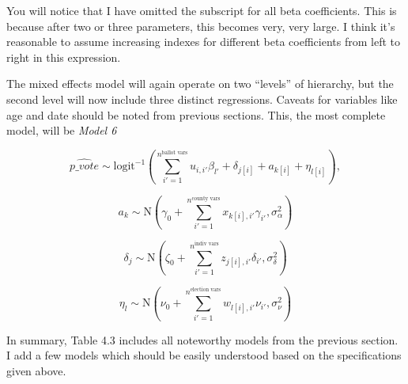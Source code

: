 \documentclass[12pt,twoside]{reedthesis}
\begin{document}
  You will notice that I have omitted the subscript for all beta
  coefficients. This is because after two or three parameters, this
  becomes very, very large. I think it's reasonable to assume increasing
  indexes for different beta coefficients from left to right in this
  expression.
  
  The mixed effects model will again operate on two ``levels'' of
  hierarchy, but the second level will now include three distinct
  regressions. Caveats for variables like age and date should be noted
  from previous sections. This, the most complete model, will be
  \emph{Model 6}
  
  \[\hat{p\_vote} \sim \text{logit}^{-1}(\sum_{i' = 1}^{n^{\text{ballot vars}}}u_{i,i'}\beta_{l'} +\delta_{j[i]} + a_{k[i]} + \eta_{l[i]}),\]
  
  \[a_{k} \sim \text{N}(\gamma_0 + \sum_{i'=1}^{n^{\text{county vars}}}x_{k[i], i'}\gamma_{i'}, \sigma_{\alpha}^2)\]
  
  \[\delta_{j} \sim \text{N}(\zeta_0 + \sum_{i'=1}^{n^{\text{indiv vars}}}z_{j[i], i'}\delta_{i'}, \sigma_{\delta}^2)\]
  
  \[\eta_{l} \sim \text{N}(\nu_0 + \sum_{i'=1}^{n^{\text{election vars}}}w_{l[i], i'}\nu_{i'}, \sigma_{\nu}^2)\]
  
  In summary, Table 4.3 includes all noteworthy models from the previous
  section. I add a few models which should be easily understood based on
  the specifications given above.
  
\end{document}
